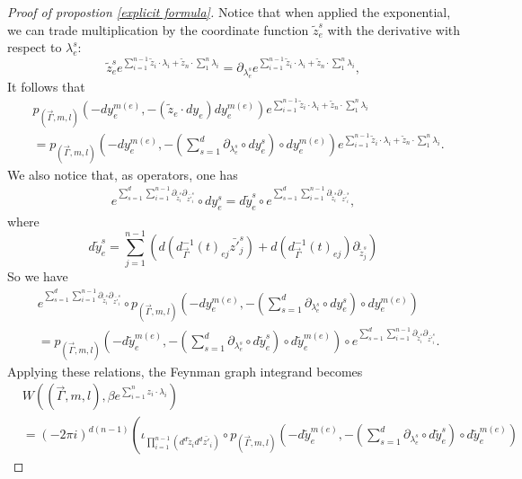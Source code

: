 \documentclass[11pt]{amsart}
\theoremstyle{definition}
\theoremstyle{remark}
\numberwithin{equation}{section}
\begin{document}
\begin{proof}[Proof of propostion \ref{explicit formula}]
    Notice that when applied the exponential, we can trade multiplication by the coordinate function $\tilde{z}^s_e$
    with the derivative with respect to $\lambda_e^s$: 
    $$
    \tilde{z}^{s}_{e}e^{\sum_{i=1}^{n-1}\tilde{z}_{i}\cdot\lambda_{i}+\tilde{z}_{n}\cdot\sum_{1}^{n}\lambda_{i}}=\partial_{\lambda_{e}^{s}}e^{\sum_{i=1}^{n-1}\tilde{z}_{i}\cdot\lambda_{i}+\tilde{z}_{n}\cdot\sum_{1}^{n}\lambda_{i}},
    $$
    It follows that 
    \begin{align*}
        &p_{(\vec{\Gamma},m,l)}(-dy_{e}^{m(e)},-(\tilde{z}_{e}\cdot dy_{e})dy_{e}^{m(e)})e^{\sum_{i=1}^{n-1}\tilde{z}_{i}\cdot\lambda_{i}+\tilde{z}_{n}\cdot\sum_{1}^{n}\lambda_{i}}\\
        &=
        p_{(\vec{\Gamma},m,l)}(-dy_{e}^{m(e)},-(\sum_{s=1}^{d}\partial_{\lambda_{e}^{s}}\circ dy_{e}^{s})\circ dy_{e}^{m(e)})e^{\sum_{i=1}^{n-1}\tilde{z}_{i}\cdot\lambda_{i}+\tilde{z}_{n}\cdot\sum_{1}^{n}\lambda_{i}}.
    \end{align*}
    We also notice that, as operators, one has
    \begin{align*}
        e^{\sum_{s=1}^{d}\sum_{i=1}^{n-1}\partial_{\tilde{z}_{i}^{s}}\partial_{\bar{z'}_{i}^{s}}}\circ dy_{e}^{s}=d\tilde{y}_{e}^{s}\circ
        e^{\sum_{s=1}^{d}\sum_{i=1}^{n-1}\partial_{\tilde{z}_{i}^{s}}\partial_{\bar{z'}_{i}^{s}}},
    \end{align*}
    where 
    $$
    d\tilde{y}_{e}^{s}=\sum_{j=1}^{n-1}\left(
        d\left(d^{-1}_{\vec{\Gamma}}(t)_{ej}\bar{z'}_{j}^{s}\right)+d\left(d^{-1}_{\vec{\Gamma}}(t)_{ej}\right)\partial_{\tilde{z}_{j}^{s}}
        \right)
    $$
    So we have
    \begin{align*}
        &e^{\sum_{s=1}^{d}\sum_{i=1}^{n-1}\partial_{\tilde{z}_{i}^{s}}\partial_{\bar{z'}_{i}^{s}}}\circ
        p_{(\vec{\Gamma},m,l)}(-dy_{e}^{m(e)},-(\sum_{s=1}^{d}\partial_{\lambda_{e}^{s}}\circ dy_{e}^{s})\circ dy_{e}^{m(e)})\\
        &=
        p_{(\vec{\Gamma},m,l)}(-d\tilde{y}_{e}^{m(e)},-(\sum_{s=1}^{d}\partial_{\lambda_{e}^{s}}\circ d\tilde{y}_{e}^{s})\circ d\tilde{y}_{e}^{m(e)})\circ 
        e^{\sum_{s=1}^{d}\sum_{i=1}^{n-1}\partial_{\tilde{z}_{i}^{s}}\partial_{\bar{z'}_{i}^{s}}}.
    \end{align*}
    Applying these relations, the Feynman graph integrand becomes
    \begin{align*}
        &W((\vec{\Gamma},m,l),\beta e^{\sum_{i=1}^{n}z_{i}\cdot\lambda_{i}})\\
        &=(-2\pi i)^{d(n-1)}\left(
        \iota_{\prod_{i=1}^{n-1}(d^{d}\tilde{z}_{i}d^{d}\bar{z'}_{i})}\circ p_{(\vec{\Gamma},m,l)}(-d\tilde{y}_{e}^{m(e)},-(\sum_{s=1}^{d}\partial_{\lambda_{e}^{s}}\circ d\tilde{y}_{e}^{s})\circ d\tilde{y}_{e}^{m(e)})

\end{align*}
\end{proof}
\end{document}
